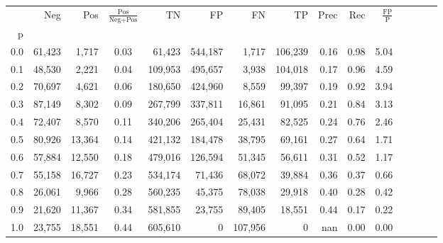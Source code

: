 \begin{tabular}{rrrcrrrrrrrrrrr}
\toprule
{} &     Neg &     Pos & $\frac{\text{Pos}}{\text{Neg}+\text{Pos}}$ &       TN &       FP &       FN &       TP &  Prec &   Rec & $\frac{\text{FP}}{\text{P}}$ \\
p   &         &         &                                            &          &          &          &          &       &       &                              \\
\midrule
0.0 &  61,423 &   1,717 &                                       0.03 &   61,423 &  544,187 &    1,717 &  106,239 &  0.16 &  0.98 &                         5.04 \\
0.1 &  48,530 &   2,221 &                                       0.04 &  109,953 &  495,657 &    3,938 &  104,018 &  0.17 &  0.96 &                         4.59 \\
0.2 &  70,697 &   4,621 &                                       0.06 &  180,650 &  424,960 &    8,559 &   99,397 &  0.19 &  0.92 &                         3.94 \\
0.3 &  87,149 &   8,302 &                                       0.09 &  267,799 &  337,811 &   16,861 &   91,095 &  0.21 &  0.84 &                         3.13 \\
0.4 &  72,407 &   8,570 &                                       0.11 &  340,206 &  265,404 &   25,431 &   82,525 &  0.24 &  0.76 &                         2.46 \\
0.5 &  80,926 &  13,364 &                                       0.14 &  421,132 &  184,478 &   38,795 &   69,161 &  0.27 &  0.64 &                         1.71 \\
0.6 &  57,884 &  12,550 &                                       0.18 &  479,016 &  126,594 &   51,345 &   56,611 &  0.31 &  0.52 &                         1.17 \\
0.7 &  55,158 &  16,727 &                                       0.23 &  534,174 &   71,436 &   68,072 &   39,884 &  0.36 &  0.37 &                         0.66 \\
0.8 &  26,061 &   9,966 &                                       0.28 &  560,235 &   45,375 &   78,038 &   29,918 &  0.40 &  0.28 &                         0.42 \\
0.9 &  21,620 &  11,367 &                                       0.34 &  581,855 &   23,755 &   89,405 &   18,551 &  0.44 &  0.17 &                         0.22 \\
1.0 &  23,755 &  18,551 &                                       0.44 &  605,610 &        0 &  107,956 &        0 &   nan &  0.00 &                         0.00 \\
\bottomrule
\end{tabular}
